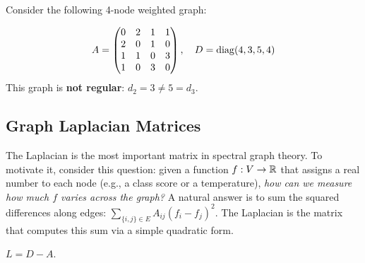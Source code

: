 \begin{notechapter}
\begin{numericalexample}[title=Adjacency and Degree Matrices]
\label{semi-supervised-graphs:numex:4node}
Consider the following 4-node weighted graph:

\begin{center}
\end{center}

\[
A = \begin{pmatrix} 0&2&1&1 \\ 2&0&1&0 \\ 1&1&0&3 \\ 1&0&3&0 \end{pmatrix}, \quad
D = \operatorname{diag}(4,3,5,4)
\]
This graph is \textbf{not regular}: $d_2 = 3 \neq 5 = d_3$.
\end{numericalexample}

\subsection{Graph Laplacian Matrices}

The Laplacian is the most important matrix in spectral graph theory. To
motivate it, consider this question: given a function $f: V \to \mathbb{R}$ that
assigns a real number to each node (e.g., a class score or a temperature),
\emph{how can we measure how much $f$ varies across the graph?} A natural
answer is to sum the squared differences along edges:
$\sum_{\{i,j\} \in E} A_{ij}(f_i - f_j)^2$. The Laplacian is the matrix that
computes this sum via a simple quadratic form.

\begin{definition}
\label{semi-supervised-graphs:def:laplacian}
$L = D - A$.
\end{definition}


\end{notechapter}
